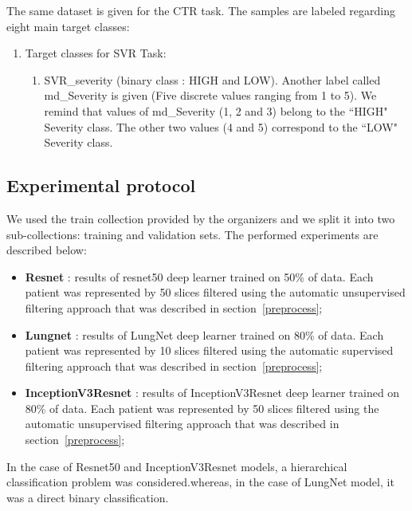The same dataset is given for the CTR task. The samples are labeled regarding eight main target classes: 
\begin{enumerate}
\item Target classes for SVR Task:
\begin{enumerate}
\item SVR\_severity (binary class : HIGH and LOW). Another label called md\_Severity is given (Five discrete values ranging from 1 to 5). We remind that values of md\_Severity (1, 2 and 3) belong to the ``HIGH" Severity class. The other two values (4 and 5) correspond to the ``LOW" Severity class.
\end{enumerate}
\end{enumerate}
\subsection{Experimental protocol}

We used the train collection provided by the organizers and we split it into two sub-collections: training and validation sets. The performed experiments are described below:
\begin{itemize}

\item \textbf{Resnet} : results of resnet50 deep learner trained on 50\% of data. Each patient was represented by 50 slices filtered using the automatic unsupervised filtering approach that was described in section~\ref{preprocess};

\item \textbf{Lungnet} : results of LungNet deep learner trained on 80\% of data. Each patient was represented by 10 slices filtered using the automatic supervised filtering approach that was described in section~\ref{preprocess};

\item \textbf{InceptionV3Resnet} : results of InceptionV3Resnet deep learner trained on 80\% of data. Each patient was represented by 50 slices filtered using the automatic unsupervised filtering approach that was described in section~\ref{preprocess};
\end{itemize}

In the case of Resnet50 and InceptionV3Resnet models, a hierarchical classification problem was considered.whereas, in the case of LungNet model, it was a direct binary classification.
